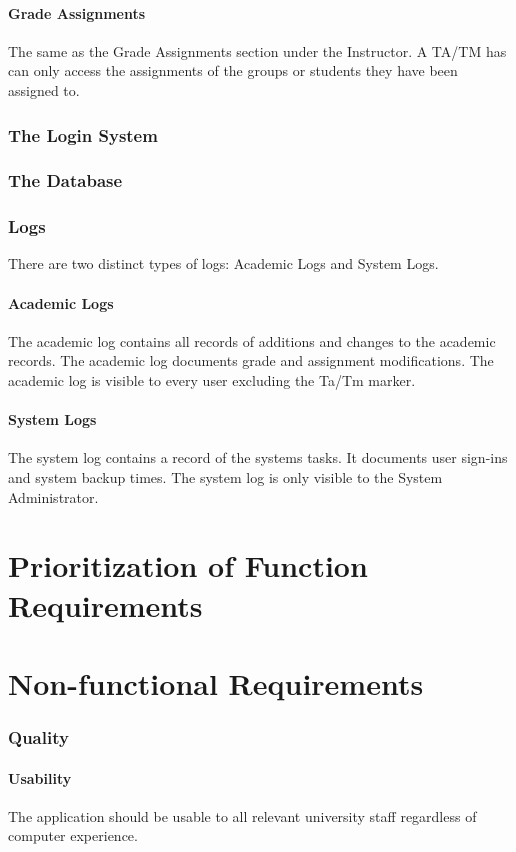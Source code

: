 \documentclass{article}
\begin{document}
\subsection{Grade Assignments}
The same as the Grade Assignments section under the Instructor.
A TA/TM has can only access the assignments of the groups or students they
have been assigned to.

\section{The Login System}

\section{The Database}

\section{Logs}
There are two distinct types of logs: Academic Logs and System Logs.
\subsection{Academic Logs}
The academic log contains all records of additions and changes to the academic records.
The academic log documents grade and assignment modifications.  The academic log
is visible to every user excluding the Ta/Tm marker.
\subsection{System Logs}
The system log contains a record of the systems tasks.  It documents user sign-ins
and system backup times. The system log is only visible to the System Administrator.

\part{Prioritization of Function Requirements}

\part{Non-functional Requirements}
\section{Quality}
\subsection{Usability}
The application should be usable to all relevant university staff
regardless of computer experience.
\end{document}
